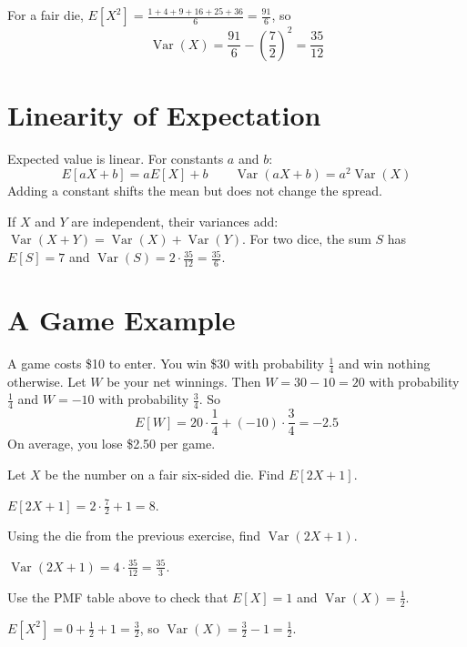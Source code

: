 For a fair die, $E[X^2] = \frac{1 + 4 + 9 + 16 + 25 + 36}{6} = \frac{91}{6}$, so
$$\operatorname{Var}(X) = \frac{91}{6} - \left(\frac{7}{2}\right)^2 = \frac{35}{12}$$

\section{Linearity of Expectation}
Expected value is linear. For constants $a$ and $b$:
$$E[aX + b] = aE[X] + b \qquad \operatorname{Var}(aX + b) = a^2\operatorname{Var}(X)$$
Adding a constant shifts the mean but does not change the spread.

If $X$ and $Y$ are independent, their variances add:
$\operatorname{Var}(X + Y) = \operatorname{Var}(X) + \operatorname{Var}(Y)$.
For two dice, the sum $S$ has $E[S] = 7$ and $\operatorname{Var}(S) = 2 \cdot \frac{35}{12} = \frac{35}{6}$.

\section{A Game Example}
A game costs \$10 to enter. You win \$30 with probability $\frac{1}{4}$ and win
nothing otherwise. Let $W$ be your net winnings. Then $W = 30 - 10 = 20$ with
probability $\frac{1}{4}$ and $W = -10$ with probability $\frac{3}{4}$. So
$$E[W] = 20 \cdot \frac{1}{4} + (-10) \cdot \frac{3}{4} = -2.5$$
On average, you lose \$2.50 per game.

\begin{Exercise}[label=rv1, title=Expected value of a die]
Let $X$ be the number on a fair six-sided die. Find $E[2X + 1]$.
\end{Exercise}
\begin{Answer}[ref=rv1]
$E[2X + 1] = 2 \cdot \frac{7}{2} + 1 = 8$.
\end{Answer}

\begin{Exercise}[label=rv2, title=Variance after scaling]
Using the die from the previous exercise, find $\operatorname{Var}(2X + 1)$.
\end{Exercise}
\begin{Answer}[ref=rv2]
$\operatorname{Var}(2X + 1) = 4 \cdot \frac{35}{12} = \frac{35}{3}$.
\end{Answer}

\begin{Exercise}[label=rv3, title=Two coin flips]
Use the PMF table above to check that $E[X] = 1$ and $\operatorname{Var}(X) = \frac{1}{2}$.
\end{Exercise}
\begin{Answer}[ref=rv3]
$E[X^2] = 0 + \frac{1}{2} + 1 = \frac{3}{2}$, so $\operatorname{Var}(X) = \frac{3}{2} - 1 = \frac{1}{2}$.
\end{Answer}

